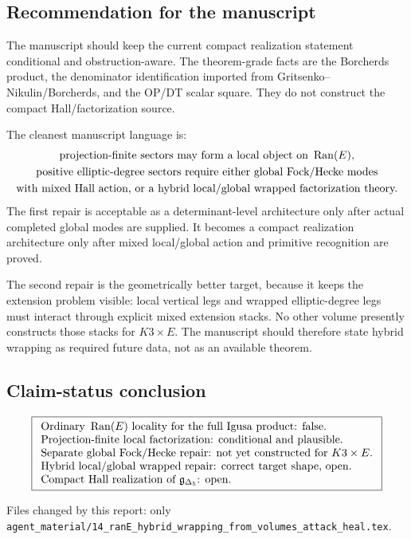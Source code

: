 \subsection{Recommendation for the manuscript}

The manuscript should keep the current compact realization statement
conditional and obstruction-aware.  The theorem-grade facts are the
Borcherds product, the denominator identification imported from
Gritsenko--Nikulin/Borcherds, and the OP/DT scalar square.  They do not
construct the compact Hall/factorization source.

The cleanest manuscript language is:
\[
\begin{gathered}
\hbox{projection-finite sectors may form a local object on }\operatorname{Ran}(E),\\
\hbox{positive elliptic-degree sectors require either global Fock/Hecke
modes}\\
\hbox{with mixed Hall action, or a hybrid local/global wrapped
factorization theory.}
\end{gathered}
\]
The first repair is acceptable as a determinant-level architecture only
after actual completed global modes are supplied.  It becomes a compact
realization architecture only after mixed local/global action and
primitive recognition are proved.

The second repair is the geometrically better target, because it keeps
the extension problem visible: local vertical legs and wrapped
elliptic-degree legs must interact through explicit mixed extension
stacks.  No other volume presently constructs those stacks for
\(K3\times E\).  The manuscript should therefore state hybrid wrapping
as required future data, not as an available theorem.

\subsection{Claim-status conclusion}

\[
\boxed{
\begin{array}{l}
\text{Ordinary }\operatorname{Ran}(E)\text{ locality for the full Igusa product:
false.}\\
\text{Projection-finite local factorization: conditional and plausible.}\\
\text{Separate global Fock/Hecke repair: not yet constructed for
}K3\times E.\\
\text{Hybrid local/global wrapped repair: correct target shape, open.}\\
\text{Compact Hall realization of }\mathfrak g_{\Delta_5}\text{: open.}
\end{array}}
\]

Files changed by this report: only
\verb|agent_material/14_ranE_hybrid_wrapping_from_volumes_attack_heal.tex|.
